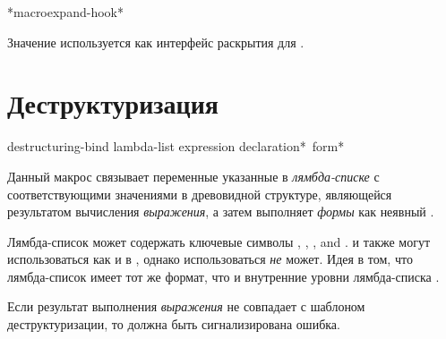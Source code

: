 \begin{defun}[Variable]
*macroexpand-hook*

Значение  используется как интерфейс раскрытия для
.
\end{defun}

\section{Деструктуризация}

\begin{defmac}
destructuring-bind lambda-list expression {declaration}* {\,form}*

   Данный макрос связывает переменные указанные в \emph{лямбда-списке} с
   соответствующими значениями в древовидной структуре, являющейся результатом
   вычисления \emph{выражения}, а затем выполняет \emph{формы} как неявный .

Лямбда-список может содержать ключевые символы , , 
, and .
 и  также могут использоваться как и в ,
однако  использоваться \emph{не} может.
Идея в том, что лямбда-список  имеет тот же формат, что
и внутренние уровни лямбда-списка .

Если результат выполнения \emph{выражения} не совпадает с шаблоном
деструктуризации, то должна быть сигнализирована ошибка.
\end{defmac}

\fi